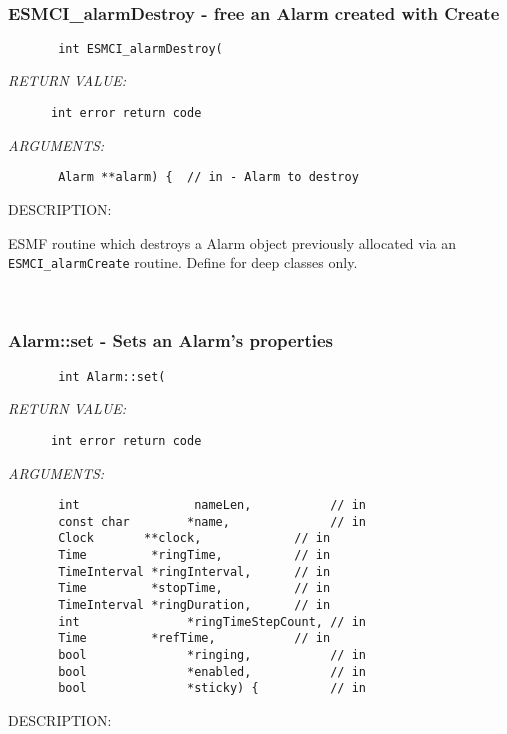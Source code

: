 \mbox{}\hrulefill\ 
 
\subsubsection [ESMCI\_alarmDestroy] {ESMCI\_alarmDestroy - free an Alarm created with Create}


  
\begin{verbatim}       int ESMCI_alarmDestroy(\end{verbatim}{\em RETURN VALUE:}
\begin{verbatim}      int error return code\end{verbatim}{\em ARGUMENTS:}
\begin{verbatim}       Alarm **alarm) {  // in - Alarm to destroy\end{verbatim}
{\sf DESCRIPTION:\\ }


        ESMF routine which destroys a Alarm object previously allocated
        via an {\tt ESMCI_alarmCreate} routine.  Define for deep classes only.
   
 
\mbox{}\hrulefill\ 
 
\subsubsection [Alarm::set] {Alarm::set - Sets an Alarm's properties}


  
\begin{verbatim}       int Alarm::set(\end{verbatim}{\em RETURN VALUE:}
\begin{verbatim}      int error return code\end{verbatim}{\em ARGUMENTS:}
\begin{verbatim}       int                nameLen,           // in
       const char        *name,              // in
       Clock       **clock,             // in
       Time         *ringTime,          // in
       TimeInterval *ringInterval,      // in
       Time         *stopTime,          // in
       TimeInterval *ringDuration,      // in
       int               *ringTimeStepCount, // in
       Time         *refTime,           // in
       bool              *ringing,           // in
       bool              *enabled,           // in
       bool              *sticky) {          // in\end{verbatim}
{\sf DESCRIPTION:\\ }


